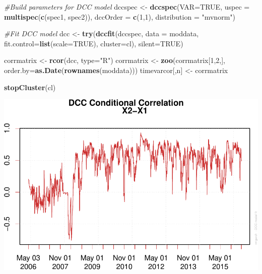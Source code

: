 \documentclass[]{elsarticle} %
\makeatletter
\newenvironment{Shaded}{\begin{snugshade}}{\end{snugshade}}
\newcommand{\KeywordTok}[1]{\textcolor[rgb]{0.13,0.29,0.53}{\textbf{{#1}}}}
\newcommand{\DataTypeTok}[1]{\textcolor[rgb]{0.13,0.29,0.53}{{#1}}}
\newcommand{\DecValTok}[1]{\textcolor[rgb]{0.00,0.00,0.81}{{#1}}}
\newcommand{\StringTok}[1]{\textcolor[rgb]{0.31,0.60,0.02}{{#1}}}
\newcommand{\CommentTok}[1]{\textcolor[rgb]{0.56,0.35,0.01}{\textit{{#1}}}}
\newcommand{\OtherTok}[1]{\textcolor[rgb]{0.56,0.35,0.01}{{#1}}}
\newcommand{\NormalTok}[1]{{#1}}
\def\maxwidth{\ifdim\Gin@nat@width>\linewidth\linewidth
\else\Gin@nat@width\fi}
\let\Oldincludegraphics\includegraphics
\renewcommand{\includegraphics}[1]{\Oldincludegraphics[width=\maxwidth]{#1}}
\makeatother
\begin{document}
\begin{Shaded}
\begin{Highlighting}[]
\CommentTok{#Build parameters for DCC model }
\NormalTok{dccspec <-}\StringTok{ }\KeywordTok{dccspec}\NormalTok{(}\DataTypeTok{VAR=}\OtherTok{TRUE}\NormalTok{, }\DataTypeTok{uspec =} \KeywordTok{multispec}\NormalTok{(}\KeywordTok{c}\NormalTok{(spec1, spec2)), }\DataTypeTok{dccOrder =} \KeywordTok{c}\NormalTok{(}\DecValTok{1}\NormalTok{,}\DecValTok{1}\NormalTok{), }
                   \DataTypeTok{distribution =} \StringTok{"mvnorm"}\NormalTok{)}

\CommentTok{#Fit DCC model}
\NormalTok{dcc <-}\StringTok{ }\KeywordTok{try}\NormalTok{(}\KeywordTok{dccfit}\NormalTok{(dccspec, }\DataTypeTok{data =} \NormalTok{moddata, }\DataTypeTok{fit.control=}\KeywordTok{list}\NormalTok{(}\DataTypeTok{scale=}\OtherTok{TRUE}\NormalTok{), }\DataTypeTok{cluster=}\NormalTok{cl), }
           \DataTypeTok{silent=}\OtherTok{TRUE}\NormalTok{)}

\NormalTok{corrmatrix <-}\StringTok{ }\KeywordTok{rcor}\NormalTok{(dcc, }\DataTypeTok{type=}\StringTok{"R"}\NormalTok{)}
\NormalTok{corrmatrix <-}\StringTok{ }\KeywordTok{zoo}\NormalTok{(corrmatrix[}\DecValTok{1}\NormalTok{,}\DecValTok{2}\NormalTok{,], }\DataTypeTok{order.by=}\KeywordTok{as.Date}\NormalTok{(}\KeywordTok{rownames}\NormalTok{(moddata)))}
\NormalTok{timevarcor[,n] <-}\StringTok{ }\NormalTok{corrmatrix}

\KeywordTok{stopCluster}\NormalTok{(cl) }
\end{Highlighting}
\end{Shaded}

\includegraphics{report_files/figure-latex/analysis232011-1.pdf}
\end{document}
